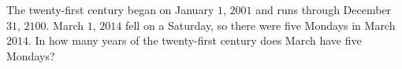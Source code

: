 The twenty-first century began on January $1$, $2001$ and runs through December $31$, $2100$. March $1$, $2014$ fell on a Saturday, so there were five Mondays in March $2014$. In how many years of the twenty-first century does March have five Mondays?
